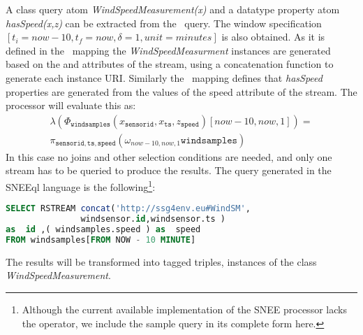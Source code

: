 A class query atom \textit{WindSpeedMeasurement(x)} and a datatype property atom \textit{hasSpeed(x,z)} can be extracted from the \linebreak \sparqlstr\ query. The window specification $[t_i=now-10,t_f=now,\delta=1,unit=minutes]$ is also obtained. As it is defined in the \stwoo\ mapping the \textit{WindSpeedMeasurment} instances are generated based on the  and  attributes of the  stream, using a concatenation function to generate each instance URI.
Similarly the \stwoo\ mapping defines that \textit{hasSpeed} properties are generated from the values of the speed attribute of the  stream. The processor will evaluate this as:
\begin{align*}
\lambda(\Phi_{\mathtt{windsamples}}(x_{\mathtt{sensorid}},x_{\mathtt{ts}},z_{\mathtt{speed}})[now-10,now,1]) = \\ \pi_{\mathtt{sensorid,ts,speed}}(\omega_{now-10,now,1} \mathtt{windsamples})
\end{align*}
In this case no joins and other selection conditions are needed, and only one stream has to be queried to produce the results. The query generated in the SNEEql language is the following\footnote {Although the current available implementation of the SNEE processor lacks the  operator, we include the sample query in its complete form here.}:

\begin{lstlisting}[style=HaskellSNEE,language=SQL,frame=none]
SELECT RSTREAM concat('http://ssg4env.eu#WindSM',
               windsensor.id,windsensor.ts )
as  id ,( windsamples.speed ) as  speed
FROM windsamples[FROM NOW - 10 MINUTE]
\end{lstlisting}
%
The results will be transformed into tagged triples, instances of the class \textit{WindSpeedMeasurement}.



